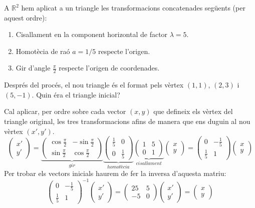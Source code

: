  \Exercise A $\mathbb{R}^2$ hem aplicat a un triangle les transformacions concatenades següents (per aquest ordre):
  \begin{enumerate}
    \item Cisallament en la component horizontal de factor $\lambda=5$.
    \item Homotècia de raó $a=1/5$ respecte l'origen.
    \item Gir d'angle $\frac{\pi}{2}$ respecte l'origen de coordenades.
  \end{enumerate}
  Després del procés, el nou triangle és el format pels vèrtex $(1,1)$, $(2,3)$ i $(5,-1)$. Quin éra el triangle inicial?

  \Answer Cal aplicar, per ordre sobre cada vector $(x,y)$ que defineix els vèrtex del triangle original, les tres transformacions afins de manera que ens duguin al nou vèrtex $(x',y')$.
  \[
    \begin{pmatrix}x'\\y'\end{pmatrix}=
    \underbrace{\begin{pmatrix}\cos{\frac{\pi}{2}} & -\sin{\frac{\pi}{2}}\\\sin{\frac{\pi}{2}}&\cos{\frac{\pi}{2}}\end{pmatrix}}_{gir}
    \underbrace{\begin{pmatrix}\frac{1}{5} &0\\0&\frac{1}{5}\end{pmatrix}}_{homotècia}
    \underbrace{\begin{pmatrix}1&5\\0&1\end{pmatrix}}_{cisallament}
    \begin{pmatrix}x\\y\end{pmatrix}=
    \begin{pmatrix}0&-\frac{1}{5}\\\frac{1}{5}&1\end{pmatrix}
    \begin{pmatrix}x\\y\end{pmatrix}
  \]
  Per trobar els vectors inicials haurem de fer la inversa d'aquesta matriu:
  \[
    \begin{pmatrix}0&-\frac{1}{5}\\\frac{1}{5}&1\end{pmatrix}^{-1}\begin{pmatrix}x'\\y'\end{pmatrix}=
    \begin{pmatrix}25&5\\-5&0\end{pmatrix}\begin{pmatrix}x'\\y'\end{pmatrix}=
    \begin{pmatrix}x\\y\end{pmatrix}
  \]
